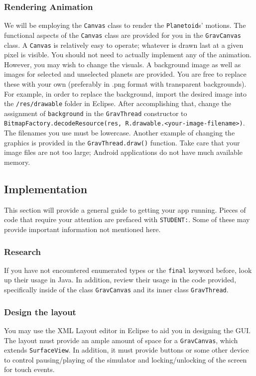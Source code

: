\subsubsection{Rendering Animation}

We will be employing the \verb=Canvas= class to render the \verb=Planetoid=s' motions.
The functional aspects of the \verb=Canvas= class are provided for you in the \verb=GravCanvas= class.
A \verb=Canvas= is relatively easy to operate; whatever is drawn last at a given pixel is visible.
You should not need to actually implement any of the animation.
However, you may wish to change the visuals.
A background image as well as images for selected and unselected planets are provided.
You are free to replace these with your own (preferably in .png format with transparent backgrounds).
For example, in order to replace the background, import the desired image into the \verb=/res/drawable= folder in Eclipse.
After accomplishing that, change the assignment of \verb=background= in the \verb=GravThread= constructor to \verb=BitmapFactory.decodeResource(res, R.drawable.<your-image-filename>)=.
The filenames you use must be lowercase.
Another example of changing the graphics is provided in the \verb=GravThread.draw()= function.
Take care that your image files are not too large; Android applications do not have much available memory.

\subsection{Implementation}
This section will provide a general guide to getting your app running.
Pieces of code that require your attention are prefaced with \verb=STUDENT:=.
Some of these may provide important information not mentioned here.

\subsubsection{Research}
If you have not encountered enumerated types or the \verb=final= keyword before, look up their usage in Java.
In addition, review their usage in the code provided, specifically inside of the class \verb=GravCanvas= and its inner class \verb=GravThread=.

\subsubsection{Design the layout}
You may use the XML Layout editor in Eclipse to aid you in designing the GUI.
The layout must provide an ample amount of space for a \verb=GravCanvas=, which extends \verb=SurfaceView=.
In addition, it must provide buttons or some other device to control pausing/playing of the simulator and locking/unlocking of the screen for touch events.

